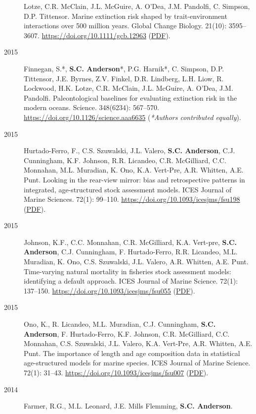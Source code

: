 \begin{description}
Lotze, C.R. McClain, J.L. McGuire, A. O'Dea, J.M. Pandolfi, C. Simpson,
D.P. Tittensor. Marine extinction risk shaped by trait-environment
interactions over 500 million years. Global Change Biology. 21(10):
3595--3607. \url{https://doi.org/10.1111/gcb.12963}
(\href{https://sean.updog.co/papers/Orzechowski_etal_2015_paleometa.pdf}{PDF}).
\item[2015]
Finnegan, S.*, \textbf{S.C. Anderson}*, P.G. Harnik*, C. Simpson, D.P.
Tittensor, J.E. Byrnes, Z.V. Finkel, D.R. Lindberg, L.H. Liow, R.
Lockwood, H.K. Lotze, C.R. McClain, J.L. McGuire, A. O'Dea, J.M.
Pandolfi. Paleontological baselines for evaluating extinction risk in
the modern oceans. Science. 348(6234): 567--570.
\url{https://doi.org/10.1126/science.aaa6635} (\emph{*Authors
contributed equally}).
\item[2015]
Hurtado-Ferro, F., C.S. Szuwalski, J.L. Valero, \textbf{S.C. Anderson},
C.J. Cunningham, K.F. Johnson, R.R. Licandeo, C.R. McGilliard, C.C.
Monnahan, M.L. Muradian, K. Ono, K.A. Vert-Pre, A.R. Whitten, A.E. Punt.
Looking in the rear-view mirror: bias and retrospective patterns in
integrated, age-structured stock assessment models. ICES Journal of
Marine Sciences. 72(1): 99--110.
\url{https://doi.org/10.1093/icesjms/fsu198}
(\href{https://sean.updog.co/papers/Hurtado-Ferro_etal_2014_retrospective.pdf}{PDF}).
\item[2015]
Johnson, K.F., C.C. Monnahan, C.R. McGilliard, K.A. Vert-pre,
\textbf{S.C. Anderson}, C.J. Cunningham, F. Hurtado-Ferro, R.R.
Licandeo, M.L. Muradian, K. Ono, C.S. Szuwalski, J.L. Valero, A.R.
Whitten, A.E. Punt. Time-varying natural mortality in fisheries stock
assessment models: identifying a default approach. ICES Journal of
Marine Science. 72(1): 137--150.
\url{https://doi.org/10.1093/icesjms/fsu055}
(\href{http://icesjms.oxfordjournals.org/content/early/2014/04/09/icesjms.fsu055.full.pdf?keytype=ref\&ijkey=NEXmZIkz3289u3z}{PDF}).
\item[2015]
Ono, K., R. Licandeo, M.L. Muradian, C.J. Cunningham, \textbf{S.C.
Anderson}, F. Hurtado-Ferro, K.F. Johnson, C.R. McGilliard, C.C.
Monnahan, C.S. Szuwalski, J.L. Valero, K.A. Vert-Pre, A.R. Whitten, A.E.
Punt. The importance of length and age composition data in statistical
age-structured models for marine species. ICES Journal of Marine
Science. 72(1): 31--43. \url{https://doi.org/10.1093/icesjms/fsu007}
(\href{http://icesjms.oxfordjournals.org/content/early/2014/02/20/icesjms.fsu007.full.pdf}{PDF}).
\item[2014]
Farmer, R.G., M.L. Leonard, J.E. Mills Flemming, \textbf{S.C. Anderson}.

\end{description}
